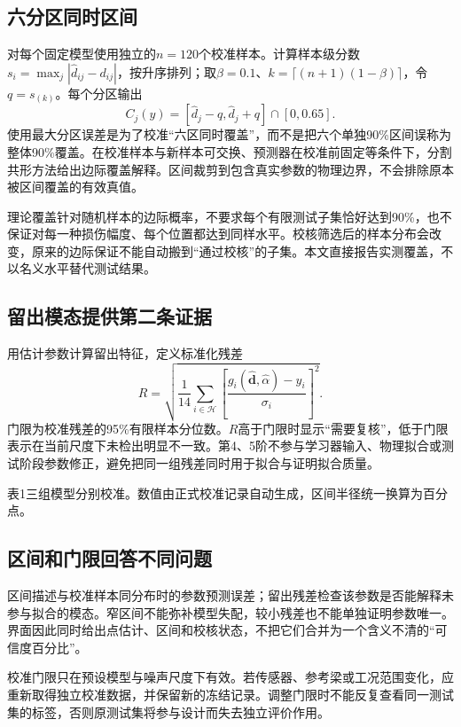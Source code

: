 \documentclass[UTF8,a4paper,11pt,fontset=fandol]{ctexart}
\newcommand{\captionline}[1]{{\small\color{muted}\noindent #1\par}}
\begin{document}
\subsection{六分区同时区间}
对每个固定模型使用独立的$n=120$个校准样本。计算样本级分数$s_i=\max_j|\hat d_{ij}-d_{ij}|$，按升序排列；取$\beta=0.1$、$k=\lceil(n+1)(1-\beta)\rceil$，令$q=s_{(k)}$。每个分区输出
\begin{equation}
C_j(y)=[\hat d_j-q,\hat d_j+q]\cap[0,0.65].
\end{equation}
使用最大分区误差是为了校准“六区同时覆盖”，而不是把六个单独90\%区间误称为整体90\%覆盖。在校准样本与新样本可交换、预测器在校准前固定等条件下，分割共形方法给出边际覆盖解释\cite{cp}。区间裁剪到包含真实参数的物理边界，不会排除原本被区间覆盖的有效真值。

理论覆盖针对随机样本的边际概率，不要求每个有限测试子集恰好达到90\%，也不保证对每一种损伤幅度、每个位置都达到同样水平。校核筛选后的样本分布会改变，原来的边际保证不能自动搬到“通过校核”的子集。本文直接报告实测覆盖，不以名义水平替代测试结果。
\subsection{留出模态提供第二条证据}
用估计参数计算留出特征，定义标准化残差
\begin{equation}
R=\sqrt{\frac1{14}\sum_{i\in\mathcal H}\left[\frac{g_i(\hat{\boldsymbol d},\hat\alpha)-y_i}{\sigma_i}\right]^2}.
\end{equation}
门限为校准残差的95\%有限样本分位数。$R$高于门限时显示“需要复核”，低于门限表示在当前尺度下未检出明显不一致。第4、5阶不参与学习器输入、物理拟合或测试阶段参数修正，避免把同一组残差同时用于拟合与证明拟合质量。
\begin{center}\small\end{center}
\captionline{表1\quad 三组模型分别校准。数值由正式校准记录自动生成，区间半径统一换算为百分点。}
\subsection{区间和门限回答不同问题}
区间描述与校准样本同分布时的参数预测误差；留出残差检查该参数是否能解释未参与拟合的模态。窄区间不能弥补模型失配，较小残差也不能单独证明参数唯一。界面因此同时给出点估计、区间和校核状态，不把它们合并为一个含义不清的“可信度百分比”。

校准门限只在预设模型与噪声尺度下有效。若传感器、参考梁或工况范围变化，应重新取得独立校准数据，并保留新的冻结记录。调整门限时不能反复查看同一测试集的标签，否则原测试集将参与设计而失去独立评价作用。
\end{document}
